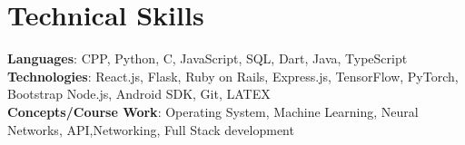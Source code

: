 \section{Technical Skills}
    \begin{itemize}[leftmargin=0.15in, label={}]
	\small{\item{
		\textbf{Languages}{: CPP, Python, C, JavaScript, SQL, Dart, Java, TypeScript} \\
		\textbf{Technologies}{: React.js, Flask, Ruby on Rails, Express.js, TensorFlow, PyTorch, Bootstrap Node.js, Android SDK, Git,  LATEX} \\
		\textbf{Concepts/Course Work}{: Operating System,  Machine Learning, Neural Networks, API,Networking, Full Stack development}
	}}
    \end{itemize}

